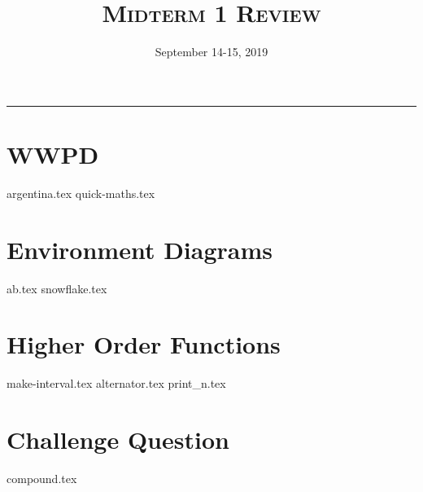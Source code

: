 \documentclass{exam}
\title{\textsc{Midterm 1 Review}}
\date{September 14-15, 2019}
\begin{document}
\maketitle
\rule{\textwidth}{0.15em}
\fontsize{12}{15}\selectfont


\section{WWPD}
\begin{questions}
{argentina.tex}
{quick-maths.tex}
\end{questions}

\newpage
\section{Environment Diagrams}
\begin{questions}
{ab.tex}
\newpage
{snowflake.tex}

\end{questions}

\newpage
\section{Higher Order Functions}
\begin{questions}
{make-interval.tex}
{alternator.tex}
{print_n.tex}

\end{questions}


\section{Challenge Question}
\begin{questions}
{compound.tex}
\end{questions}
\end{document}
